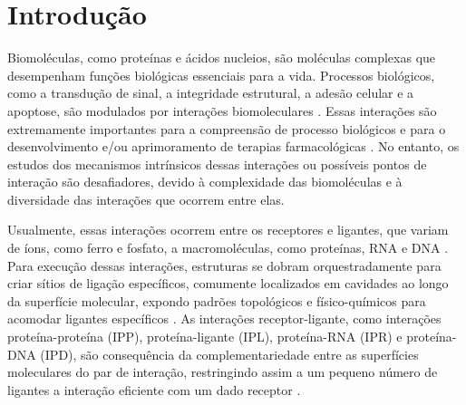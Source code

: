 \documentclass[Portugues]{phdquali}
\begin{document}
\clearpage



\tableofcontents

\fimdaspaginasiniciais



\chapter{Introdução}

Biomoléculas, como proteínas e ácidos nucleios, são moléculas complexas que desempenham funções biológicas essenciais para a vida. Processos biológicos, como a transdução de sinal, a integridade estrutural, a adesão celular e a apoptose, são modulados por interações biomoleculares \cite{sotriffer2002,henrich2010}. Essas interações são extremamente importantes para a compreensão de processo biológicos e para o desenvolvimento e/ou aprimoramento de terapias farmacológicas \cite{henrich2010}. No entanto, os estudos dos mecanismos intrínsicos dessas interações ou possíveis pontos de interação são desafiadores, devido à complexidade das biomoléculas e à diversidade das interações que ocorrem entre elas.

Usualmente, essas interações ocorrem entre os receptores e ligantes, que variam de íons, como ferro e fosfato, a macromoléculas, como proteínas, RNA e DNA \cite{oliveira2014}. Para execução dessas interações, estruturas   se dobram orquestradamente para criar sítios de ligação específicos, comumente localizados em cavidades ao longo da superfície molecular, expondo padrões topológicos e físico-químicos para acomodar ligantes específicos \cite{henrich2010,guerra2021}. As interações receptor-ligante, como interações proteína-proteína (IPP), proteína-ligante (IPL), proteína-RNA (IPR) e proteína-DNA (IPD), são consequência da complementariedade entre as superfícies moleculares do par de interação, restringindo assim a um pequeno número de ligantes a interação eficiente com um dado receptor \cite{henrich2010,simoes2017}.
\end{document}
